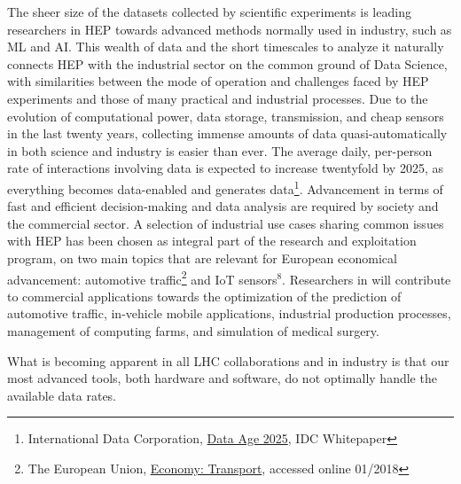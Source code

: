The sheer size of the datasets collected by scientific experiments is leading researchers in HEP towards advanced methods normally used in industry, such as ML and AI. 
This wealth of data and the short timescales to analyze it naturally connects HEP with the industrial sector on the common ground of Data Science, with similarities between the mode of operation and challenges faced by HEP experiments and those of many practical and industrial processes. 
Due to the evolution of computational power, data storage, transmission, and cheap sensors in the last twenty years, collecting immense amounts of data quasi-automatically in both science and industry is easier than ever. 
The average daily, per-person rate of interactions involving data is expected to increase twentyfold by 2025, as everything becomes data-enabled and generates data\footnote{International Data Corporation, \href{https://www.seagate.com/files/www-content/our-story/trends/files/Seagate-WP-DataAge2025-March-2017.pdf}{Data Age 2025}, IDC Whitepaper}.
Advancement in terms of fast and efficient decision-making and data analysis are required by society and the commercial sector. A selection of industrial use cases sharing common issues with HEP has been chosen as integral part of the \acronym research and exploitation program, on two main topics that are
relevant for European economical advancement: automotive traffic\footnote{The European Union, \href{https://europa.eu/european-union/about-eu/figures/economy_en}{Economy: Transport}, accessed online 01/2018} and IoT sensors$^8$. 
Researchers in \acronym will contribute to commercial applications towards the optimization of the prediction of automotive traffic, in-vehicle mobile applications, industrial production processes, management of computing farms, and simulation of medical surgery. 

\vskip2pt
What is becoming apparent in all LHC collaborations and in industry is that our most advanced tools, both hardware and software, do not optimally handle the available data rates. 

